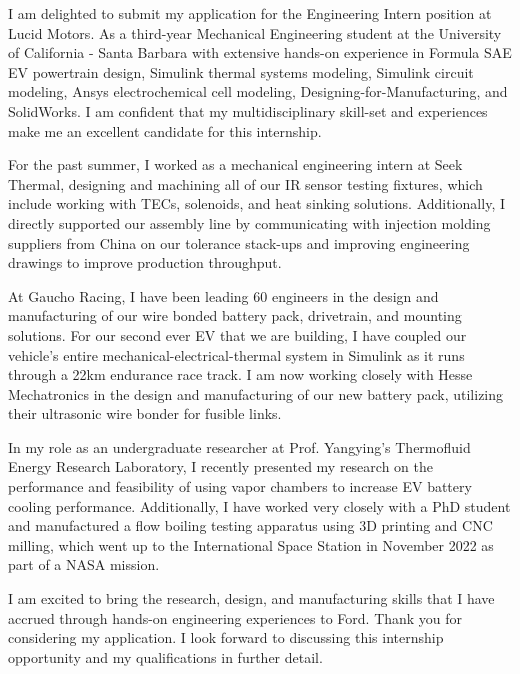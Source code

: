 \documentclass[11pt, letterpaper]{awesome-cv} %
\begin{document}
\begin{cvletter}
I am delighted to submit my application for the Engineering Intern position at Lucid Motors. As a third-year Mechanical Engineering student at the University of California - Santa Barbara with extensive hands-on experience in Formula SAE EV powertrain design, Simulink thermal systems modeling, Simulink circuit modeling, Ansys electrochemical cell modeling, Designing-for-Manufacturing, and  SolidWorks. I am confident that my multidisciplinary skill-set and experiences make me an excellent candidate for this internship.

For the past summer, I worked as a mechanical engineering intern at Seek Thermal, designing and machining all of our IR sensor testing fixtures, which include working with TECs, solenoids, and heat sinking solutions. Additionally, I directly supported our assembly line by communicating with injection molding suppliers from China on our tolerance stack-ups and improving engineering drawings to improve production throughput. 

At Gaucho Racing, I have been leading 60 engineers in the design and manufacturing of our wire bonded battery pack, drivetrain, and mounting solutions. For our second ever EV that we are building, I have coupled our vehicle's entire mechanical-electrical-thermal system in Simulink as it runs through a 22km endurance race track. I am now working closely with Hesse Mechatronics in the design and manufacturing of our new battery pack, utilizing their ultrasonic wire bonder for fusible links. 

In my role as an undergraduate researcher at Prof. Yangying's Thermofluid Energy Research Laboratory, I recently presented my research on the performance and feasibility of using vapor chambers to increase EV battery cooling performance. Additionally, I have worked very closely with a PhD student and manufactured a flow boiling testing apparatus using 3D printing and CNC milling, which went up to the International Space Station in November 2022 as part of a NASA mission. 

I am excited to bring the research, design, and manufacturing skills that I have accrued through hands-on engineering experiences to Ford. Thank you for considering my application. I look forward to discussing this internship opportunity and my qualifications in further detail.


\end{cvletter}


\makeletterclosing %
\end{document}
